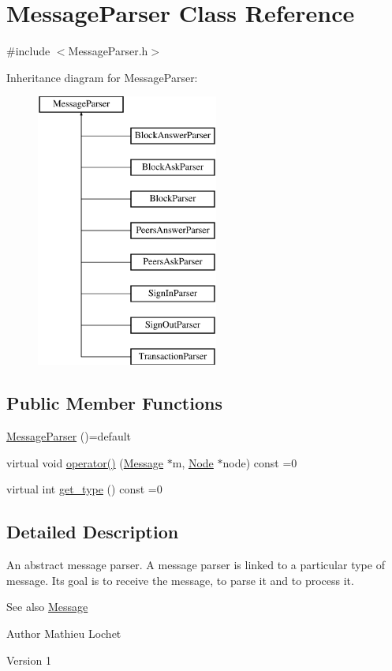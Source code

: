 \hypertarget{classMessageParser}{}\section{Message\+Parser Class Reference}
\label{classMessageParser}


{\ttfamily \#include $<$Message\+Parser.\+h$>$}

Inheritance diagram for Message\+Parser\+:\begin{figure}[H]
\begin{center}
\leavevmode
\includegraphics[height=9.000000cm]{classMessageParser}
\end{center}
\end{figure}
\subsection*{Public Member Functions}
\begin{DoxyCompactItemize}
\item 
\mbox{\hyperlink{classMessageParser_a6548628a6db83ec8913e5f17454e14f0}{Message\+Parser}} ()=default
\item 
virtual void \mbox{\hyperlink{classMessageParser_a946f3b936dc01a75d6165329b159ecfe}{operator()}} (\mbox{\hyperlink{classMessage}{Message}} $\ast$m, \mbox{\hyperlink{classNode}{Node}} $\ast$node) const =0
\item 
virtual int \mbox{\hyperlink{classMessageParser_aa7c495d7b28a394e5752ca25ffff69d8}{get\+\_\+type}} () const =0
\end{DoxyCompactItemize}


\subsection{Detailed Description}
An abstract message parser. A message parser is linked to a particular type of message. Its goal is to receive the message, to parse it and to process it. \begin{DoxySeeAlso}{See also}
\mbox{\hyperlink{classMessage}{Message}}
\end{DoxySeeAlso}
\begin{DoxyAuthor}{Author}
Mathieu Lochet 
\end{DoxyAuthor}
\begin{DoxyVersion}{Version}
1 
\end{DoxyVersion}


